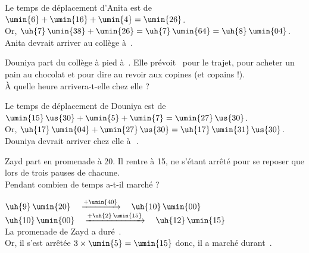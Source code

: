\begin{colonne*exercice}
\begin{corrige}
   Le temps de déplacement d'Anita est de \\
   $\umin{6}+\umin{16}+\umin{4} =\umin{26}$. \\
   Or, $\uh{7}\,\umin{38}+\umin{26} =\uh{7}\,\umin{64} =\uh{8}\,\umin{04}$. \\
   {\blue Anita devrait arriver au collège à \,}. \\
\end{corrige}

\bigskip


\begin{exercice} %
   Douniya part du collège à pied à \,. Elle prévoit \, pour le trajet,  pour acheter un pain au chocolat et  pour dire au revoir aux copines (et copains !). \\
   À quelle heure arrivera-t-elle chez elle ?
\end{exercice}

\begin{corrige}
   Le temps de déplacement de Douniya est de \\
   $\umin{15}\,\us{30}+\umin{5}+\umin{7} =\umin{27}\,\us{30}$. \\
   Or, $\uh{17}\,\umin{04}+\umin{27}\,\us{30} =\uh{17}\,\umin{31}\,\us{30}$. \\
   {\blue Douniya devrait arriver chez elle à \,\,}. \\
\end{corrige}

\bigskip


\begin{exercice} %
   Zayd part en promenade à  20. Il rentre à 15, ne s'étant arrêté pour se reposer que lors de trois pauses de  chacune. \\
   Pendant combien de temps a-t-il marché ?
\end{exercice}

\begin{corrige}
   $\uh{9}\,\umin{20} \quad \xrightarrow{+\umin{40}} \quad \uh{10}\,\umin{00}$ \\
   $\uh{10}\,\umin{00} \quad \xrightarrow{+\uh{2} \, \umin{15}} \quad \uh{12}\,\umin{15}$ \\
   La promenade de Zayd a duré \,. \\
   Or, il s'est arrêtée $3\times\umin{5} =\umin{15}$ donc, {\blue il a marché durant \,}. \\
\end{corrige}


\end{colonne*exercice}
